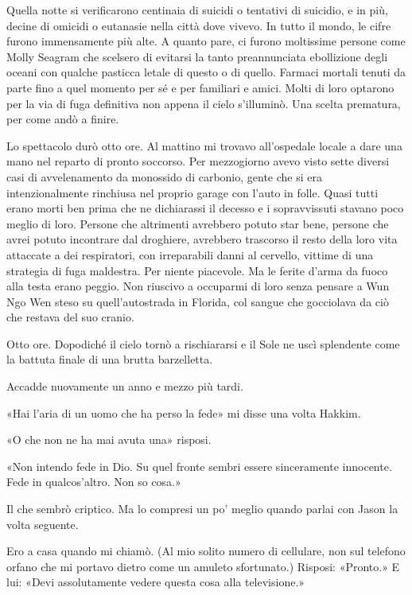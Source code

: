 Quella notte si verificarono centinaia di suicidi o tentativi di
suicidio, e in più, decine di omicidi o eutanasie nella città dove
vivevo. In tutto il mondo, le cifre furono immensamente più alte. A
quanto pare, ci furono moltissime persone come Molly Seagram che
scelsero di evitarsi la tanto preannunciata ebollizione degli oceani con
qualche pasticca letale di questo o di quello. Farmaci mortali tenuti da
parte fino a quel momento per sé e per familiari e amici. Molti di loro
optarono per la via di fuga definitiva non appena il cielo s'illuminò.
Una scelta prematura, per come andò a finire.

Lo spettacolo durò otto ore. Al mattino mi trovavo all'ospedale locale a
dare una mano nel reparto di pronto soccorso. Per mezzogiorno avevo
visto sette diversi casi di avvelenamento da monossido di carbonio,
gente che si era intenzionalmente rinchiusa nel proprio garage con
l'auto in folle. Quasi tutti erano morti ben prima che ne dichiarassi il
decesso e i sopravvissuti stavano poco meglio di loro. Persone che
altrimenti avrebbero potuto star bene, persone che avrei potuto
incontrare dal droghiere, avrebbero trascorso il resto della loro vita
attaccate a dei respiratori, con irreparabili danni al cervello, vittime
di una strategia di fuga maldestra. Per niente piacevole. Ma le ferite
d'arma da fuoco alla testa erano peggio. Non riuscivo a occuparmi di
loro senza pensare a Wun Ngo Wen steso su quell'autostrada in Florida,
col sangue che gocciolava da ciò che restava del suo cranio.

Otto ore. Dopodiché il cielo tornò a rischiararsi e il Sole ne uscì
splendente come la battuta finale di una brutta barzelletta.

Accadde nuovamente un anno e mezzo più tardi.

\separatorefiori

«Hai l'aria di un uomo che ha perso la fede» mi disse una volta Hakkim.

«O che non ne ha mai avuta una» risposi.

«Non intendo fede in Dio. Su quel fronte sembri essere sinceramente
innocente. Fede in qualcos'altro. Non so cosa.»

Il che sembrò criptico. Ma lo compresi un po' meglio quando parlai con
Jason la volta seguente.

Ero a casa quando mi chiamò. (Al mio solito numero di cellulare, non sul
telefono orfano che mi portavo dietro come un amuleto sfortunato.)
Risposi: «Pronto.» E lui: «Devi assolutamente vedere questa cosa alla
televisione.»

